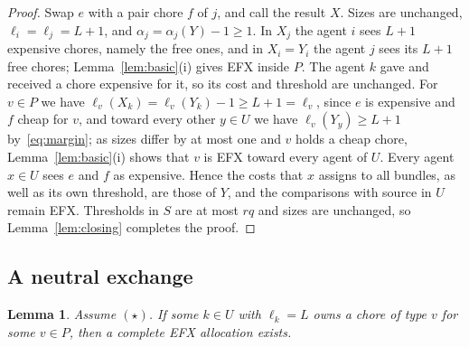 \documentclass{amsart}
\numberwithin{equation}{section}
\newtheorem{lemma}[theorem]{Lemma}
\theoremstyle{definition}
\theoremstyle{remark}
\begin{document}
\begin{proof}
Swap $e$ with a pair chore $f$ of $j$, and call the result $X$. Sizes are unchanged, $\ell_i=\ell_j=L+1$, and $\alpha_j=\alpha_j(Y)-1\ge1$. In $X_j$ the agent $i$ sees $L+1$ expensive chores, namely the free ones, and in $X_i=Y_i$ the agent $j$ sees its $L+1$ free chores; Lemma~\ref{lem:basic}(i) gives EFX inside $P$. The agent $k$ gave and received a chore expensive for it, so its cost and threshold are unchanged. For $v\in P$ we have $\ell_v(X_k)=\ell_v(Y_k)-1\ge L+1=\ell_v$, since $e$ is expensive and $f$ cheap for $v$, and toward every other $y\in U$ we have $\ell_v(Y_y)\ge L+1$ by~\eqref{eq:margin}; as sizes differ by at most one and $v$ holds a cheap chore, Lemma~\ref{lem:basic}(i) shows that $v$ is EFX toward every agent of $U$. Every agent $x\in U$ sees $e$ and $f$ as expensive. Hence the costs that $x$ assigns to all bundles, as well as its own threshold, are those of $Y$, and the comparisons with source in $U$ remain EFX. Thresholds in $S$ are at most $rq$ and sizes are unchanged, so Lemma~\ref{lem:closing} completes the proof.
\end{proof}

\subsection{A neutral exchange}

\begin{lemma}\label{lem:neutral}
Assume $(\star)$. If some $k\in U$ with $\ell_k=L$ owns a chore of type $v$ for some $v\in P$, then a complete EFX allocation exists.
\end{lemma}
\end{document}
